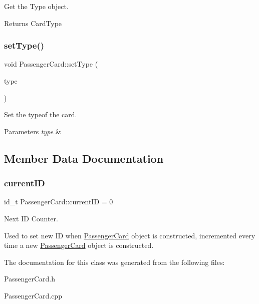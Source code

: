 Get the Type object. 

\begin{DoxyReturn}{Returns}
Card\+Type 
\end{DoxyReturn}
\mbox{\label{classPassengerCard_ab0c4c67f185dc1abee907b6cd50413bf}} 
\subsubsection{\texorpdfstring{set\+Type()}{setType()}}
{\footnotesize\ttfamily void Passenger\+Card\+::set\+Type (\begin{DoxyParamCaption}\item[{\mbox{\hyperlink{classPassengerCard_ac30388c823af514403463a797e2878af}{Card\+Type}}}]{type }\end{DoxyParamCaption})}



Set the typeof the card. 


\begin{DoxyParams}{Parameters}
{\em type} & \\
\hline
\end{DoxyParams}


\subsection{Member Data Documentation}
\mbox{\label{classPassengerCard_af557a01fde14b95c0e0b355e777e2aec}} 
\subsubsection{\texorpdfstring{current\+ID}{currentID}}
{\footnotesize\ttfamily id\+\_\+t Passenger\+Card\+::current\+ID = 0\hspace{0.3cm}{\ttfamily [static]}}



Next ID Counter. 

Used to set new ID when \mbox{\hyperlink{classPassengerCard}{Passenger\+Card}} object is constructed, incremented every time a new \mbox{\hyperlink{classPassengerCard}{Passenger\+Card}} object is constructed. 

The documentation for this class was generated from the following files\+:\begin{DoxyCompactItemize}
\item 
Passenger\+Card.\+h\item 
Passenger\+Card.\+cpp\end{DoxyCompactItemize}
